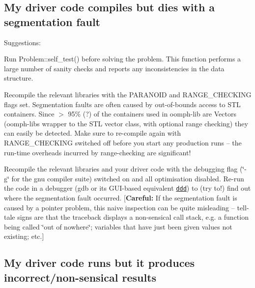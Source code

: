 \hypertarget{index_seg_fault}{}\subsection{My driver code compiles but dies with a segmentation fault}\label{index_seg_fault}
Suggestions\+:
\begin{DoxyItemize}
\item Run {\ttfamily Problem\+::self\+\_\+test()} before solving the problem. This function performs a large number of sanity checks and reports any inconsistencies in the data structure. ~\newline
~\newline

\item Recompile the relevant libraries with the P\+A\+R\+A\+N\+O\+ID and R\+A\+N\+G\+E\+\_\+\+C\+H\+E\+C\+K\+I\+NG flags set. Segmentation faults are often caused by out-\/of-\/bounds access to S\+TL containers. Since $>$ 95\% (?) of the containers used in {\ttfamily oomph-\/lib} are {\ttfamily Vectors} ({\ttfamily oomph-\/lib\textquotesingle{}s} wrapper to the S\+TL vector class, with optional range checking) they can easily be detected. Make sure to re-\/compile again with R\+A\+N\+G\+E\+\_\+\+C\+H\+E\+C\+K\+I\+NG switched off before you start any production runs -- the run-\/time overheads incurred by range-\/checking are significant! ~\newline
~\newline

\item Recompile the relevant libraries and your driver code with the debugging flag (\char`\"{}-\/g\char`\"{} for the gnu compiler suite) switched on and all optimisation disabled. Re-\/run the code in a debugger ({\ttfamily gdb} or its G\+U\+I-\/based equivalent \href{http://www.gnu.org/software/ddd/}{\tt ddd}) to (try to!) find out where the segmentation fault occurred. \mbox{[}{\bfseries Careful\+:} If the segmentation fault is caused by a pointer problem, this naive inspection can be quite misleading -- tell-\/tale signs are that the traceback displays a non-\/sensical call stack, e.\+g. a function being called \char`\"{}out of nowhere\char`\"{}; variables that have just been given values not existing; etc.\mbox{]} ~\newline
~\newline
 


\end{DoxyItemize}\hypertarget{index_wrong_results}{}\subsection{My driver code runs but it produces incorrect/non-\/sensical results}\label{index_wrong_results}
